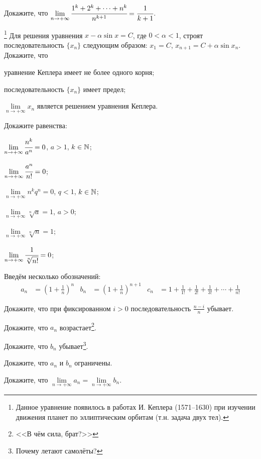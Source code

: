 \documentclass[a4paper, 12pt, num=31]{listok}
\begin{document}
\begin{problem}
    Докажите, что $\lim\limits_{n \to + \infty} \cfrac{1^k + 2^k + \cdots + n^k}{n^{k + 1}} = \cfrac1{k + 1}$.
\end{problem}
\begin{problem}\footnote{%
        Данное уравнение появилось в работах И. Кеплера (1571--1630) при изучении движения планет по эллиптическим орбитам (т.н. задача двух тел).}
    Для решения уравнения $x - \alpha \sin x = C$, где $0 < \alpha < 1$,
    строят последовательность $\{x_n\}$ следующим образом: $x_1 = C$, $x_{n + 1} = C + \alpha \sin x_n$.
    Докажите, что
    \begin{probparts}
        \item уравнение Кеплера имеет не более одного корня;
        \item последовательность $\{x_n\}$ имеет предел;
        \item $\lim\limits_{n\to +\infty} x_n$ является решением уравнения Кеплера.
    \end{probparts}
\end{problem}
\begin{problem}[(\textup{[:|||:]})]
    Докажите равенства:
    \begin{probparts}
        \item $\lim\limits_{n \to + \infty} \cfrac{n^k}{a^n} = 0$, $a > 1$, $k \in \mathbb{N}$;
        \item $\lim\limits_{n \to + \infty} \cfrac{a^n}{n!} = 0$;
        \item $\lim\limits_{n \to + \infty} {n^k}{q^n} = 0$, $q < 1$, $k \in \mathbb{N}$;
        \item $\lim\limits_{n \to + \infty} \sqrt[n]a = 1$, $a > 0$;
        \item $\lim\limits_{n \to + \infty} \sqrt[n]n = 1$;
        \item $\lim\limits_{n \to + \infty} \cfrac1{\sqrt[n]{n!}} = 0$;
    \end{probparts}
\end{problem}
\begin{definition}
    Введём несколько обозначений:
    \begin{align*}
        a_n &= {\left ( 1 + \frac 1n \right )}^n &
        b_n &= {\left ( 1 + \frac 1n \right )}^{n + 1} &
        c_n &= 1 + \frac1{1!} + \frac1{2!} + \frac1{3!} + \cdots + \frac1{n!}
    \end{align*}
\end{definition}
\begin{problem}
\begin{probparts}
    \item Докажите, что при фиксированном $i > 0$ последовательность $\frac{n - i}n$ убывает.
    \item Докажите, что $a_n$ возрастает\footnote{<<В чём сила, брат?>>}.
    \item Докажите, что $b_n$ убывает\footnote{Почему летают самолёты?}.
    \item Докажите, что $a_n$ и $b_n$ ограничены.
    \item Докажите, что $\lim\limits_{n \to +\infty} a_n = \lim\limits_{n \to + \infty} b_n$.
\end{probparts}
\end{problem}
\end{document}
